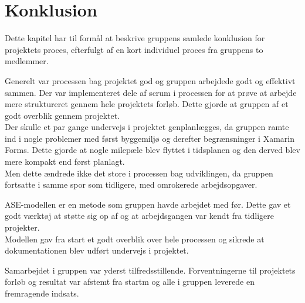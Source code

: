 \chapter{Konklusion}
Dette kapitel har til formål at beskrive gruppens samlede konklusion for projektets proces, efterfulgt af en kort individuel proces fra gruppens to medlemmer. 

Generelt var processen bag projektet god og gruppen arbejdede godt og effektivt sammen.
Der var implementeret dele af scrum i processen for at prøve at arbejde mere struktureret gennem hele projektets forløb. Dette gjorde at gruppen af et godt overblik gennem projektet. \\
Der skulle et par gange undervejs i projektet genplanlægges, da gruppen ramte ind i nogle problemer med først byggemiljø og derefter begrænsninger i Xamarin Forms. Dette gjorde at nogle milepæle blev flyttet i tidsplanen og den derved blev mere kompakt end først planlagt. \\
Men dette ændrede ikke det store i processen bag udviklingen, da gruppen fortsatte i samme spor som tidligere, med omrokerede arbejdsopgaver.

ASE-modellen er en metode som gruppen havde arbejdet med før. Dette gav et godt værktøj at støtte sig op af og at arbejdsgangen var kendt fra tidligere projekter. \\
Modellen gav fra start et godt overblik over hele processen og sikrede at dokumentationen blev udført undervejs i projektet.

Samarbejdet i gruppen var yderst tilfredsstillende. Forventningerne til projektets forløb og resultat var afstemt fra startm og alle i gruppen leverede en fremragende indsats.

%
%